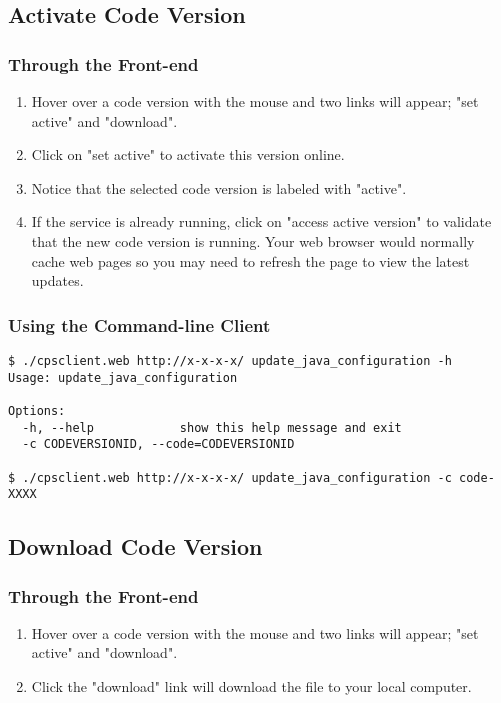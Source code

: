 \documentclass[12pt]{article}
\newenvironment{framedbox}[1]%
{\begin{framed}
 \begingroup
 \fontsize{#1}{#1}\selectfont
}
{
 \endgroup
 \end{framed}
}
\begin{document}
\subsection{Activate Code Version}
\subsubsection{Through the Front-end}
\begin{enumerate}
\item Hover over a code version with the mouse and two links will appear;
      "set active" and "download".
\item Click on "set active" to activate this version online.
\item Notice that the selected code version is labeled with "active".
\item If the service is already running, click on "access active version" to
      validate that the new code version is running. Your web browser would
      normally cache web pages so you may need to refresh the page to view
      the latest updates.
\end{enumerate}

\subsubsection{Using the Command-line Client}
\begin{framedbox}{8pt}\begin{verbatim}
$ ./cpsclient.web http://x-x-x-x/ update_java_configuration -h
Usage: update_java_configuration

Options:
  -h, --help            show this help message and exit
  -c CODEVERSIONID, --code=CODEVERSIONID

$ ./cpsclient.web http://x-x-x-x/ update_java_configuration -c code-XXXX
\end{verbatim}\end{framedbox}

\subsection{Download Code Version}
\subsubsection{Through the Front-end}
\begin{enumerate}
\item Hover over a code version with the mouse and two links will appear;
      "set active" and "download".
\item Click the "download" link will download the file to your local computer.
\end{enumerate}
\end{document}
